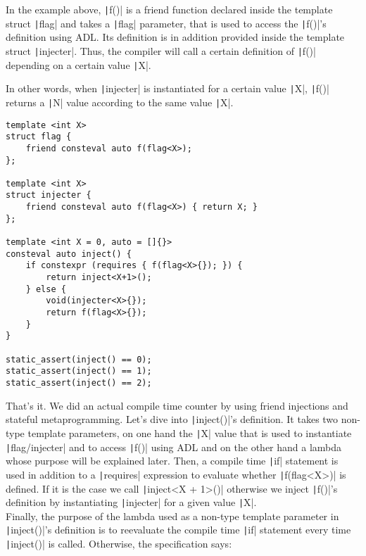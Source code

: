 	In the example above, \texttt|f()| is a friend function declared inside the template struct \texttt|flag| and takes a \texttt|flag| parameter, that is used to access the \texttt|f()|'s definition using ADL. Its definition is in addition provided inside the template struct \texttt|injecter|. Thus, the compiler will call a certain definition of \texttt|f()| depending on a certain value \texttt|X|.  
	
	In other words, when \texttt|injecter| is instantiated for a certain value \texttt|X|, \texttt|f()| returns a \texttt|N| value according to the same value \texttt|X|.

	\begin{verbatim}
template <int X>
struct flag {
    friend consteval auto f(flag<X>);
};

template <int X>
struct injecter {
    friend consteval auto f(flag<X>) { return X; }
};

template <int X = 0, auto = []{}>
consteval auto inject() {
    if constexpr (requires { f(flag<X>{}); }) {
        return inject<X+1>();
    } else {
        void(injecter<X>{});
        return f(flag<X>{});
    }
}

static_assert(inject() == 0);
static_assert(inject() == 1);
static_assert(inject() == 2);
	\end{verbatim}

	That's it. We did an actual compile time counter by using friend injections and stateful metaprogramming. Let's dive into \texttt|inject()|'s definition. It takes two non-type template parameters, on one hand the \texttt|X| value that is used to instantiate \texttt|flag/injecter| and to access \texttt|f()| using ADL and on the other hand a lambda whose purpose will be explained
	later. Then, a compile time \texttt|if| statement is used in addition to a \texttt|requires| expression to evaluate whether \texttt|f(flag<X>{})| is defined. If it is the case we call \texttt|inject<X + 1>()| otherwise we inject \texttt|f()|'s definition by instantiating \texttt|injecter| for a given value \texttt|X|. \\

	Finally, the purpose of the lambda used as a non-type template parameter in \texttt|inject()|'s definition is to reevaluate the compile time \texttt|if| statement every time \texttt|inject()| is called. Otherwise, the specification says:
	
